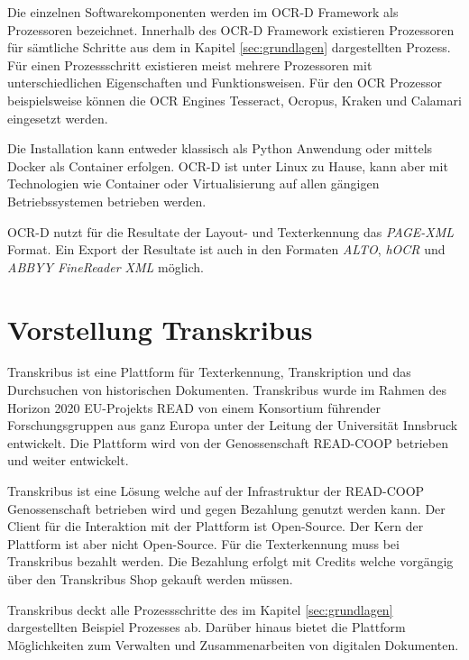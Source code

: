 \documentclass[a4paper,oneside, 12pt]{report}
\begin{document}
 Die einzelnen Softwarekomponenten werden im OCR-D Framework als Prozessoren bezeichnet. Innerhalb des OCR-D Framework existieren Prozessoren für sämtliche Schritte aus dem in Kapitel \ref{sec:grundlagen} dargestellten Prozess. Für einen Prozessschritt existieren meist mehrere Prozessoren mit unterschiedlichen Eigenschaften und Funktionsweisen. Für den \ac{OCR} Prozessor beispielsweise können die OCR Engines Tesseract, Ocropus, Kraken und Calamari eingesetzt werden. 

Die Installation kann entweder klassisch als Python Anwendung oder mittels Docker als Container erfolgen. OCR-D ist unter Linux zu Hause, kann aber mit Technologien wie Container oder Virtualisierung auf allen gängigen Betriebssystemen betrieben werden. \cite{ocrdsetup}

OCR-D nutzt für die Resultate der Layout- und Texterkennung das \textit{PAGE-XML} Format. Ein Export der Resultate ist auch in den Formaten \textit{ALTO}, \textit{hOCR} und \textit{ABBYY FineReader XML} möglich. \cite{ocrdfaq}


\section{Vorstellung Transkribus}
Transkribus ist eine Plattform für Texterkennung, Transkription und das Durchsuchen von historischen Dokumenten. Transkribus wurde im Rahmen des Horizon 2020 EU-Projekts READ von einem Konsortium führender Forschungsgruppen aus ganz Europa unter der Leitung der Universität Innsbruck entwickelt. Die Plattform wird von der Genossenschaft READ-COOP betrieben und weiter entwickelt. \cite{readcoopabout} 

Transkribus ist eine Lösung welche auf der Infrastruktur der READ-COOP Genossenschaft betrieben wird und gegen Bezahlung genutzt werden kann. Der Client für die Interaktion mit der Plattform ist Open-Source. Der Kern der Plattform ist aber nicht Open-Source. Für die Texterkennung muss bei Transkribus bezahlt werden. Die Bezahlung erfolgt mit Credits welche vorgängig über den Transkribus Shop gekauft werden müssen. \cite{transkribuspricing}

Transkribus deckt alle Prozessschritte des im Kapitel \ref{sec:grundlagen} dargestellten Beispiel Prozesses ab. Darüber hinaus bietet die Plattform Möglichkeiten zum Verwalten und Zusammenarbeiten von digitalen Dokumenten. \cite{transkribus}
\end{document}
